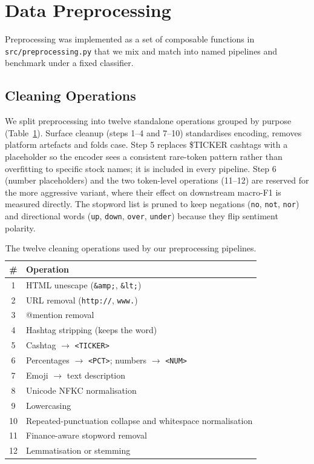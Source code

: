 \documentclass[12pt,a4paper]{article}
\begin{document}
\section{Data Preprocessing}
\label{sec:preprocessing}

\begin{sloppypar}
Preprocessing was implemented as a set of composable functions in \texttt{src/preprocessing.py} that we mix and match into named pipelines and benchmark under a fixed classifier.
\end{sloppypar}

\subsection{Cleaning Operations}

We split preprocessing into twelve standalone operations grouped by purpose (Table~\ref{tab:steps}). Surface cleanup (steps 1--4 and 7--10) standardises encoding, removes platform artefacts and folds case. Step 5 replaces \$TICKER cashtags with a placeholder so the encoder sees a consistent rare-token pattern rather than overfitting to specific stock names; it is included in every pipeline. Step 6 (number placeholders) and the two token-level operations (11--12) are reserved for the more aggressive variant, where their effect on downstream macro-F1 is measured directly. The stopword list is pruned to keep negations (\texttt{no}, \texttt{not}, \texttt{nor}) and directional words (\texttt{up}, \texttt{down}, \texttt{over}, \texttt{under}) because they flip sentiment polarity.

\begin{table}[!htbp]
\centering
\small
\begin{tabular}{cl}
\toprule
\textbf{\#} & \textbf{Operation} \\
\midrule
1  & HTML unescape (\texttt{\&amp;}, \texttt{\&lt;}) \\
2  & URL removal (\texttt{http://}, \texttt{www.}) \\
3  & @mention removal \\
4  & Hashtag stripping (keeps the word) \\
5  & Cashtag $\rightarrow$ \texttt{<TICKER>} \\
6  & Percentages $\rightarrow$ \texttt{<PCT>}; numbers $\rightarrow$ \texttt{<NUM>} \\
7  & Emoji $\rightarrow$ text description \\
8  & Unicode NFKC normalisation \\
9  & Lowercasing \\
10 & Repeated-punctuation collapse and whitespace normalisation \\
11 & Finance-aware stopword removal \\
12 & Lemmatisation or stemming \\
\bottomrule
\end{tabular}
\caption{The twelve cleaning operations used by our preprocessing pipelines.}
\label{tab:steps}
\end{table}
\end{document}
